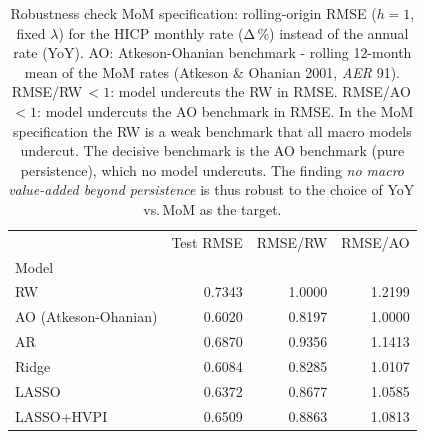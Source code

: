 \begin{table}
\caption{Robustness check MoM specification: rolling-origin RMSE ($h=1$, fixed $\lambda$) for the HICP monthly rate (Δ\,\%) instead of the annual rate (YoY). AO: Atkeson-Ohanian benchmark - rolling 12-month mean of the MoM rates (Atkeson \& Ohanian 2001, \emph{AER} 91). RMSE/RW\,$<1$: model undercuts the RW in RMSE. RMSE/AO\,$<1$: model undercuts the AO benchmark in RMSE. In the MoM specification the RW is a weak benchmark that all macro models undercut. The decisive benchmark is the AO benchmark (pure persistence), which no model undercuts. The finding \emph{no macro value-added beyond persistence} is thus robust to the choice of YoY\,vs.\,MoM as the target.}
\label{tab:robustheit_mom}
\begin{tabular}{lrrr}
\toprule
 & Test RMSE & RMSE/RW & RMSE/AO \\
Model &  &  &  \\
\midrule
RW & 0.7343 & 1.0000 & 1.2199 \\
AO (Atkeson-Ohanian) & 0.6020 & 0.8197 & 1.0000 \\
AR & 0.6870 & 0.9356 & 1.1413 \\
Ridge & 0.6084 & 0.8285 & 1.0107 \\
LASSO & 0.6372 & 0.8677 & 1.0585 \\
LASSO+HVPI & 0.6509 & 0.8863 & 1.0813 \\
\bottomrule
\end{tabular}
\end{table}
